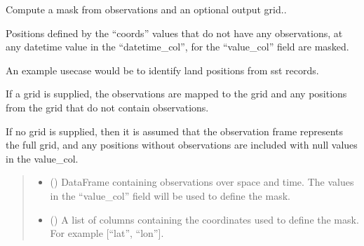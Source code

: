 \documentclass[letterpaper,10pt,english]{sphinxmanual}
\begin{document}
\begin{fulllineitems}
\label{\detokenize{misc:glomar_gridding.mask.mask_from_obs_frame}}
\pysigstartsignatures
\pysiglinewithargsret
{}
{\sphinxparamcomma {}\sphinxparamcomma {}\sphinxparamcomma {}\sphinxparamcomma {}\sphinxparamcomma {}}
{}
\pysigstopsignatures
\sphinxAtStartPar
Compute a mask from observations and an optional output grid..

\sphinxAtStartPar
Positions defined by the “coords” values that do not have any observations,
at any datetime value in the “datetime\_col”, for the “value\_col” field are
masked.

\sphinxAtStartPar
An example use\sphinxhyphen{}case would be to identify land positions from sst records.

\sphinxAtStartPar
If a grid is supplied, the observations are mapped to the grid and any
positions from the grid that do not contain observations.

\sphinxAtStartPar
If no grid is supplied, then it is assumed that the observation frame
represents the full grid, and any positions without observations are
included with null values in the value\_col.
\begin{quote}\begin{description}
\begin{itemize}
\item {}
\sphinxAtStartPar
{} () \textendash{} DataFrame containing observations over space and time. The values in
the “value\_col” field will be used to define the mask.

\item {}
\sphinxAtStartPar
{} () \textendash{} A list of columns containing the coordinates used to define the mask.
For example {[}“lat”, “lon”{]}.


\end{itemize}
\end{description}
\end{quote}
\end{fulllineitems}
\end{document}
